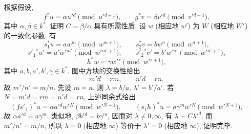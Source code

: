 根据假设,
\[
f^*u=\alpha u'{}^d\pmod {u'{}^{d+1}},\qquad
g^*v=\beta v'{}^d\pmod {v'{}^{d+1}},
\]
其中 $\alpha,\beta\in k^*$. 证明 $C=\beta/\alpha$ 具有所需性质. 设 $w$ (相应地 $w'$) 为 $W$ (相应地 $W'$) 的一致化参数. 有
\[
s_1^*u=aw^m\pmod {w^{m+1}},\qquad
s_2^*v=bw^n\pmod {w^{n+1}},
\]
\[
s'_1{}^*u'=a'w'{}^{m'}\pmod {w'{}^{m'+1}},\qquad
s'_2{}^*v'=b'w'{}^{n'}\pmod {w'{}^{n'+1}},
\]
\[
h^*w=\gamma w'{}^r\pmod {w'{}^{r+1}},
\]
其中 $a,b,a',b',\gamma\in k^*$. 图中方块的交换性给出
\[
m'd=rm,\qquad n'd=rn,
\]
故 $m'/n'=m/n$. 先设 $m=n$. 则 $\lambda=b/a$, $\lambda'=b'/a'$. 若 $N=m'd=rm=n'd=rn$, 上述同余式给出
\[
(fs'_1)^*u=\alpha a'{}^d w'{}^N\pmod {w'{}^{N+1}},\qquad
(s_1h)^*u=a\gamma^m w'{}^N\pmod {w'{}^{N+1}},
\]
故 $\alpha a'{}^d=a\gamma^m$. 类似地, $\beta b'{}^d=b\gamma^m$, 因而对 $\lambda\ne0,\infty$, 有 $\lambda=C{\lambda'}^d$. 而 $m'/n'=m/n$, 所以 $\lambda=0$ (相应地 $\infty$) 等价于 $\lambda'=0$ (相应地 $\infty$), 证明完毕.


